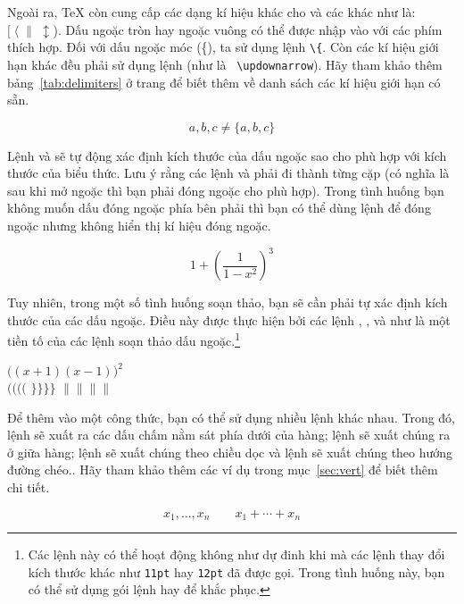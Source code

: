 \medskip

Ngoài ra, \TeX{} còn cung cấp các dạng kí hiệu khác cho \textbf{} và các  khác như
là: $[\;\langle\;\|\;\updownarrow$). Dấu ngoặc tròn hay ngoặc vuông có thể được nhập vào với các phím thích hợp. Đối với dấu ngoặc móc (\{), ta sử dụng lệnh \verb|\{|. Còn các kí hiệu giới hạn khác đều phải sử dụng lệnh (như là ~\verb|\updownarrow|). Hãy tham khảo thêm bảng~\ref{tab:delimiters} ở trang \pageref{tab:delimiters} để biết thêm về danh sách các kí hiệu giới hạn có sẵn.
\begin{example}
\begin{displaymath}
{a,b,c}\neq\{a,b,c\}
\end{displaymath}
\end{example}

Lệnh  và  sẽ tự động xác định kích thước của dấu ngoặc sao cho phù hợp với kích thước của biểu thức. Lưu ý rằng các lệnh  và  phải đi thành từng cặp (có nghĩa là sau khi mở ngoặc thì bạn phải đóng ngoặc cho phù hợp). Trong tình huống bạn không muốn dấu đóng ngoặc phía bên phải thì bạn có thể dùng lệnh  để đóng ngoặc nhưng không hiển thị kí hiệu đóng ngoặc.
\begin{example}
\begin{displaymath}
1 + \left( \frac{1}{ 1-x^{2} }
    \right) ^3
\end{displaymath}
\end{example}

Tuy nhiên, trong một số tình huống soạn thảo, bạn sẽ cần phải tự xác định kích thước của các dấu ngoặc. Điều này được thực hiện bởi các lệnh , ,  và  như là một tiền tố của các lệnh soạn thảo dấu ngoặc.\footnote{Các lệnh này có thể hoạt động không như dự đinh khi mà các lệnh thay đổi kích thước khác như \texttt{11pt} hay \texttt{12pt} đã được gọi. Trong tình huống này, bạn có thể sử dụng gói lệnh  hay  để khắc phục.}

\begin{example}
$\Big( (x+1) (x-1) \Big) ^{2}$\\
$\big(\Big(\bigg(\Bigg($\quad
$\big\}\Big\}\bigg\}\Bigg\}$\quad
$\big\|\Big\|\bigg\|\Bigg\|$
\end{example}

Để thêm \textbf{} vào một công thức, bạn có thể sử dụng nhiều lệnh khác nhau. Trong đó, lệnh  sẽ xuất ra các dấu chấm nằm sát phía dưới của hàng; lệnh  sẽ xuất chúng ra ở giữa hàng; lệnh  sẽ xuất chúng theo chiều dọc và lệnh  sẽ xuất chúng theo hướng đường chéo.. Hãy tham khảo thêm các ví dụ trong mục~\ref{sec:vert} để biết thêm chi tiết.
\begin{example}
\begin{displaymath}
x_{1},\ldots,x_{n} \qquad
x_{1}+\cdots+x_{n}
\end{displaymath}
\end{example}

